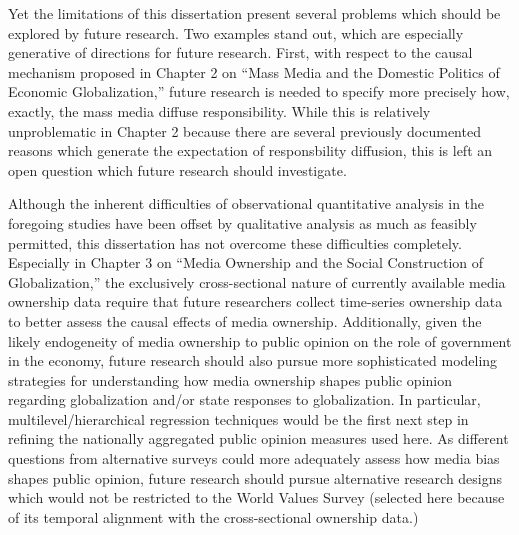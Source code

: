 \documentclass[12pt]{report}
\begin{document}
Yet the limitations of this dissertation present several problems which should be explored by future research. Two examples stand out, which are especially generative of directions for future research. First, with respect to the causal mechanism proposed in Chapter 2 on ``Mass Media and the Domestic Politics of Economic Globalization,'' future research is needed to specify more precisely how, exactly, the mass media diffuse responsibility. While this is relatively unproblematic in Chapter 2 because there are several previously documented reasons which generate the expectation of responsbility diffusion, this is left an open question which future research should investigate.

Although the inherent difficulties of observational quantitative analysis in the foregoing studies have been offset by qualitative analysis as much as feasibly permitted, this dissertation has not overcome these difficulties completely. Especially in Chapter 3 on ``Media Ownership and the Social Construction of Globalization,'' the exclusively cross-sectional nature of currently available media ownership data require that future researchers collect time-series ownership data to better assess the causal effects of media ownership. Additionally, given the likely endogeneity of media ownership to public opinion on the role of government in the economy, future research should also pursue more sophisticated modeling strategies for understanding how media ownership shapes public opinion regarding globalization and/or state responses to globalization. In particular, multilevel/hierarchical regression techniques would be the first next step in refining the nationally aggregated public opinion measures used here. As different questions from alternative surveys could more adequately assess how media bias shapes public opinion, future research should pursue alternative research designs which would not be restricted to the World Values Survey (selected here because of its temporal alignment with the cross-sectional ownership data.)






\end{document}
